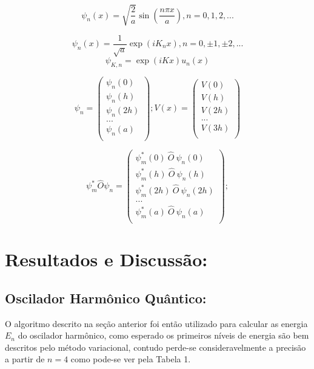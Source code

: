 \documentclass[11pt]{article}
\begin{document}
\begin{equation}
\label{eq14}
\psi_n(x) = \sqrt{\frac{2}{a}} \sin\left({\frac{n \pi x}{a}}\right), n = 0,1,2,...
\end{equation}


\begin{equation}
\label{eq15}
\psi_n(x) = \frac{1}{\sqrt{a}} \exp(i K_n x), n = 0,\pm 1,\pm 2,...
\end{equation}
\begin{equation}
\label{eq16}
 \psi_{K,n} = \exp{(iKx)} u_n(x)
\end{equation}



\begin{equation}
\psi_n = \begin{pmatrix}
  \psi_n(0) \\
  \psi_n(h) \\
  \psi_n(2h) \\
   ... \\
  \psi_n(a) \\
 \end{pmatrix};
V(x) = \begin{pmatrix}
V(0) \\
V(h) \\
V(2h) \\
... \\
V(3h) \\
\end{pmatrix}
\end{equation}


\begin{equation}
\label{eq18}
\psi_m^* \hat{O} \psi_n = \begin{pmatrix}
  \psi_m^*(0) ~\hat{O}~ \psi_n(0) \\
  \psi_m^*(h) ~\hat{O}~ \psi_n(h) \\
  \psi_m^*(2h)~\hat{O}~ \psi_n(2h) \\
   ... \\
  \psi_m^*(a) ~\hat{O}~ \psi_n(a) \\
 \end{pmatrix};
\end{equation}


\section{Resultados e Discussão:}
\label{sec:org001c0ad}
\subsection{Oscilador Harmônico Quântico:}
\label{sec:orgf1b9b10}
O algoritmo descrito na seção anterior foi então utilizado para calcular as energia \(E_n\) do oscilador harmônico, como esperado os primeiros níveis de energia são bem descritos pelo método variacional, contudo perde-se consideravelmente a precisão a partir de \(n=4\) como pode-se ver pela Tabela 1.
\end{document}
